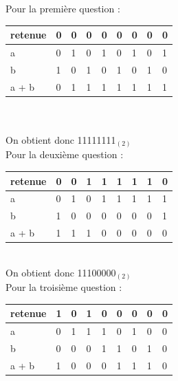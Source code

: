 \begin{Exercice}[15 minutes]
\begin{solution}
        Pour la première question :
        \\
    \begin{tabular}{| p{1cm} | p{1cm} | p{1cm} | p{1cm} | p{1cm} | p{1cm} | p{1cm} | p{1cm} | p{1cm} |} 
        \hline
    retenue & 0 & 0 & 0 & 0 & 0 & 0 & 0 & 0 \\ [0.5ex]
    \hline
        a & 0 & 1 & 0 & 1 & 0 & 1 & 0 & 1 \\ [0.5ex] 
        \hline
        b & 1 & 0 & 1 & 0 & 1 & 0 & 1 & 0 \\ [0.5ex] 
        \hline
        a + b & 0 & 1 & 1 & 1 & 1 & 1 & 1 & 1 \\ [0.5ex]
        \hline
    \end{tabular}\\ \\
    On obtient donc 11111111$_{(2)}$\\
        Pour la deuxième question : \\
        \begin{tabular}{| p{1cm} | p{1cm} | p{1cm} | p{1cm} | p{1cm} | p{1cm} | p{1cm} | p{1cm} | p{1cm} |} 
            \hline
	    retenue & 0 & 0 & 1 & 1 & 1 & 1 & 1 & 0 \\ [0.5ex]
	    \hline
            a & 0 & 1 & 0 & 1 & 1 & 1 & 1 & 1 \\ [0.5ex] 
            \hline
            b & 1 & 0 & 0 & 0 & 0 & 0 & 0 & 1 \\ [0.5ex] 
            \hline
            a + b & 1 & 1 & 1 & 0 & 0 & 0 & 0 & 0 \\ [0.5ex]
            \hline
        \end{tabular} \\

        On obtient donc 11100000$_{(2)}$ \\

        Pour la troisième question : \\
        \begin{tabular}{| p{1cm} | p{1cm} | p{1cm} | p{1cm} | p{1cm} | p{1cm} | p{1cm} | p{1cm} | p{1cm} |} 
            \hline
	    retenue & 1 & 0 & 1 & 0 & 0 & 0 & 0 & 0 \\ [0.5ex]
	    \hline
            a & 0 & 1 & 1 & 1 & 0 & 1 & 0 & 0 \\ [0.5ex] 
            \hline
            b & 0 & 0 & 0 & 1 & 1 & 0 & 1 & 0 \\ [0.5ex] 
            \hline
            a + b & 1 & 0 & 0 & 0 & 1 & 1 & 1 & 0 \\ [0.5ex]
            \hline
        \end{tabular} \\


\end{solution}
\end{Exercice}
